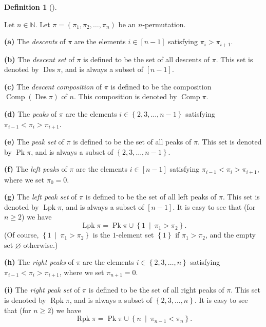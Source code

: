 \documentclass[numbers=enddot,12pt,final,onecolumn,notitlepage]{scrartcl}%
\theoremstyle{definition}
\newtheorem{defi}[theo]{Definition}
\newenvironment{definition}[1][]
{\begin{defi}[#1]\begin{leftbar}}
{\end{leftbar}\end{defi}}
\begin{document}
\begin{definition}
\label{def.Des-et-al}Let $n\in\mathbb{N}$. Let $\pi=\left(  \pi_{1},\pi
_{2},\ldots,\pi_{n}\right)  $ be an $n$-permutation.

\textbf{(a)} The \textit{descents} of $\pi$ are the elements $i\in\left[
n-1\right]  $ satisfying $\pi_{i}>\pi_{i+1}$.

\textbf{(b)} The \textit{descent set} of $\pi$ is defined to be the set of all
descents of $\pi$. This set is denoted by $\operatorname*{Des}\pi$, and is
always a subset of $\left[  n-1\right]  $.

\textbf{(c)} The \textit{descent composition} of $\pi$ is defined to be the
composition $\operatorname*{Comp}\left(  \operatorname*{Des}\pi\right)  $ of
$n$. This composition is denoted by $\operatorname*{Comp}\pi$.

\textbf{(d)} The \textit{peaks} of $\pi$ are the elements $i\in\left\{
2,3,\ldots,n-1\right\}  $ satisfying $\pi_{i-1}<\pi_{i}>\pi_{i+1}$.

\textbf{(e)} The \textit{peak set} of $\pi$ is defined to be the set of all
peaks of $\pi$. This set is denoted by $\operatorname*{Pk}\pi$, and is always
a subset of $\left\{  2,3,\ldots,n-1\right\}  $.

\textbf{(f)} The \textit{left peaks} of $\pi$ are the elements $i\in\left[
n-1\right]  $ satisfying $\pi_{i-1}<\pi_{i}>\pi_{i+1}$, where we set $\pi
_{0}=0$.

\textbf{(g)} The \textit{left peak set} of $\pi$ is defined to be the set of
all left peaks of $\pi$. This set is denoted by $\operatorname*{Lpk}\pi$, and
is always a subset of $\left[  n-1\right]  $. It is easy to see that (for
$n\geq2$) we have%
\[
\operatorname*{Lpk}\pi=\operatorname*{Pk}\pi\cup\left\{  1\ \mid\ \pi_{1}%
>\pi_{2}\right\}  .
\]
(Of course, $\left\{  1\ \mid\ \pi_{1}>\pi_{2}\right\}  $ is the $1$-element
set $\left\{  1\right\}  $ if $\pi_{1}>\pi_{2}$, and the empty set
$\varnothing$ otherwise.)

\textbf{(h)} The \textit{right peaks} of $\pi$ are the elements $i\in\left\{
2,3,\ldots,n\right\}  $ satisfying $\pi_{i-1}<\pi_{i}>\pi_{i+1}$, where we set
$\pi_{n+1}=0$.

\textbf{(i)} The \textit{right peak set} of $\pi$ is defined to be the set of
all right peaks of $\pi$. This set is denoted by $\operatorname*{Rpk}\pi$, and
is always a subset of $\left\{  2,3,\ldots,n\right\}  $. It is easy to see
that (for $n\geq2$) we have%
\[
\operatorname*{Rpk}\pi=\operatorname*{Pk}\pi\cup\left\{  n\ \mid\ \pi
_{n-1}<\pi_{n}\right\}  .
\]



\end{definition}
\end{document}

